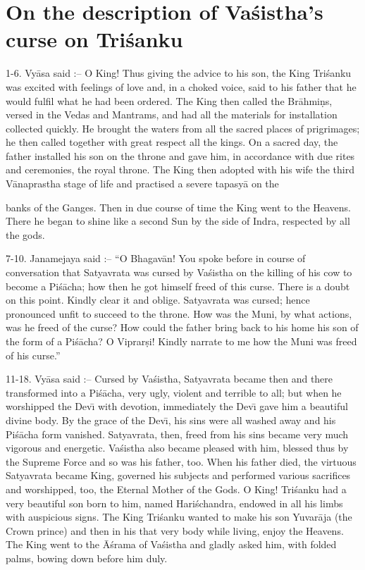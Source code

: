 \chapter{On the description of Va\'sistha's curse on Tri\'sanku}

1-6. Vy\=asa said :-- O King! Thus giving the advice to his son, the King Tri\'sanku was excited with feelings of love and, in a choked voice, said to his father that he would fulfil what he had been ordered. The King then called the Br\=ahmi\d{n}s, versed in the Vedas and Mantrams, and had all the materials for installation collected quickly. He brought the waters from all the sacred places of prigrimages; he then called together with great respect all the kings. On a sacred day, the father installed his son on the throne and gave him, in accordance with due rites and ceremonies, the royal throne. The King then adopted with his wife the third V\=anaprastha stage of life and practised a severe tapasy\=a on the

banks of the Ganges. Then in due course of time the King went to the Heavens. There he began to shine like a second Sun by the side of Indra, respected by all the gods.

7-10. Janamejaya said :-- ``O Bhagav\=an! You spoke before in course of conversation that Satyavrata was cursed by Va\'sistha on the killing of his cow to become a Pi\'s\=acha; how then he got himself freed of this curse. There is a doubt on this point. Kindly clear it and oblige. Satyavrata was cursed; hence pronounced unfit to succeed to the throne. How was the Muni, by what actions, was he freed of the curse? How could the father bring back to his home his son of the form of a Pi\'s\=acha? O Viprar\d{s}i! Kindly narrate to me how the Muni was freed of his curse.''

11-18. Vy\=asa said :-- Cursed by Va\'sistha, Satyavrata became then and there transformed into a Pi\'s\=acha, very ugly, violent and terrible to all; but when he worshipped the Dev\={\i} with devotion, immediately the Dev\={\i} gave him a beautiful divine body. By the grace of the Dev\={\i}, his sins were all washed away and his Pi\'s\=acha form vanished. Satyavrata, then, freed from his sins became very much vigorous and energetic. Va\'sistha also became pleased with him, blessed thus by the Supreme Force and so was his father, too. When his father died, the virtuous Satyavrata became King, governed his subjects and performed various sacrifices and worshipped, too, the Eternal Mother of the Gods. O King! Tri\'sanku had a very beautiful son born to him, named Hari\'schandra, endowed in all his limbs with auspicious signs. The King Tri\'sanku wanted to make his son Yuvar\=aja (the Crown prince) and then in his that very body while living, enjoy the Heavens. The King went to the \=A\'srama of Va\'sistha and gladly asked him, with folded palms, bowing down before him duly.

